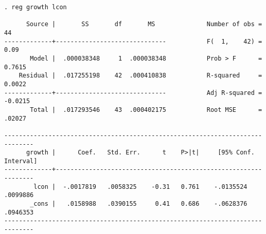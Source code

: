 
\begin{frame}[fragile]
\scriptsize
\begin{verbatim}
. reg growth lcon

      Source |       SS       df       MS              Number of obs =      44
-------------+------------------------------           F(  1,    42) =    0.09
       Model |  .000038348     1  .000038348           Prob > F      =  0.7615
    Residual |  .017255198    42  .000410838           R-squared     =  0.0022
-------------+------------------------------           Adj R-squared = -0.0215
       Total |  .017293546    43  .000402175           Root MSE      =  .02027

------------------------------------------------------------------------------
      growth |      Coef.   Std. Err.      t    P>|t|     [95% Conf. Interval]
-------------+----------------------------------------------------------------
        lcon |  -.0017819   .0058325    -0.31   0.761    -.0135524    .0099886
       _cons |   .0158988   .0390155     0.41   0.686    -.0628376    .0946353
------------------------------------------------------------------------------

\end{verbatim}
\end{frame}



